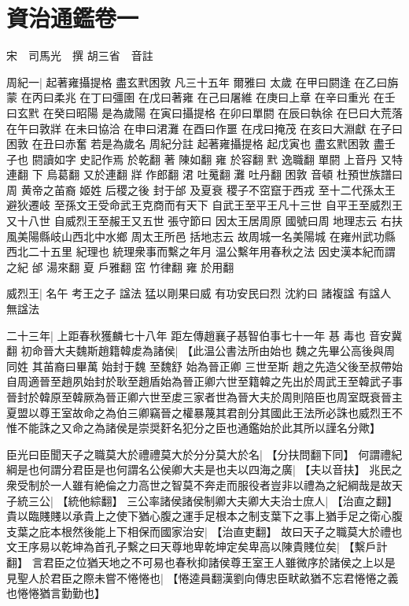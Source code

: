 \section{資治通鑑卷一}


宋　司馬光　撰\newline
胡三省　音註

周紀一|{
	起著雍攝提格 盡玄黓困敦 凡三十五年
	爾雅曰
	太歲
	在甲曰閼逢
	在乙曰旃蒙
	在丙曰柔兆
	在丁曰彊圉
	在戊曰著雍
	在己曰屠維
	在庚曰上章
	在辛曰重光
	在壬曰玄黓
	在癸曰昭陽
	是為歲陽
	在寅曰攝提格
	在卯曰單閼
	在辰曰執徐
	在巳曰大荒落
	在午曰敦牂
	在未曰協洽
	在申曰涒灘
	在酉曰作噩
	在戌曰掩茂
	在亥曰大淵獻
	在子曰困敦
	在丑曰赤奮
	若是為歲名
	周紀分註 起著雍攝提格 起戊寅也
	盡玄黓困敦 盡壬子也
	閼讀如字 史記作焉 於乾翻
	著 陳如翻
	雍 於容翻
	黓 逸職翻
	單閼 上音丹 又特連翻
	下 烏葛翻 又於連翻
	牂 作郎翻
	涒 吐䰟翻
	灘 吐丹翻
	困敦 音頓
	杜預世族譜曰 周 黄帝之苖裔 姬姓
	后稷之後 封于邰 及夏衰 稷子不窋竄于西戎
	至十二代孫太王 避狄遷岐
	至孫文王受命武王克商而有天下
	自武王至平王凡十三世
	自平王至威烈王又十八世
	自威烈王至赧王又五世
	張守節曰 因太王居周原 國號曰周
	地理志云 右扶風美陽縣岐山西北中水鄉 周太王所邑
	括地志云 故周城一名美陽城 在雍州武功縣西北二十五里 紀理也 統理衆事而繫之年月
	温公繫年用春秋之法 因史漢本紀而謂之紀
	邰 湯來翻
	夏 戶雅翻
	窋 竹律翻
	雍 於用翻}
\par
威烈王|{
	名午 考王之子
	諡法 猛以剛果曰威 有功安民曰烈
	沈約曰 諸複諡 有諡人 無諡法}
\par
二十三年|{
	上距春秋獲麟七十八年 距左傳趙襄子惎智伯事七十一年
	惎 毒也 音安冀翻}
初命晉大夫魏斯趙籍韓䖍為諸侯|{
	【此温公書法所由始也
	魏之先畢公高後與周同姓 其苖裔曰畢萬 始封于魏
	至魏舒 始為晉正卿 三世至斯
	趙之先造父後至叔帶始自周適晉至趙夙始封於耿至趙盾始為晉正卿六世至籍韓之先出於周武王至韓武子事晉封於韓原至韓厥為晉正卿六世至䖍三家者世為晉大夫於周則陪臣也周室既衰晉主夏盟以尊王室故命之為伯三卿竊晉之權暴蔑其君剖分其國此王法所必誅也威烈王不惟不能誅之又命之為諸侯是崇奨姧名犯分之臣也通鑑始於此其所以謹名分歟】}
\par
臣光曰臣聞天子之職莫大於禮禮莫大於分分莫大於名|{
	【分扶問翻下同】}
何謂禮紀綱是也何謂分君臣是也何謂名公侯卿大夫是也夫以四海之廣|{
	【夫以音扶】}
兆民之衆受制於一人雖有絶倫之力高世之智莫不奔走而服役者豈非以禮為之紀綱哉是故天子統三公|{
	【統他綜翻】}
三公率諸侯諸侯制卿大夫卿大夫治士庶人|{
	【治直之翻】}
貴以臨賤賤以承貴上之使下猶心腹之運手足根本之制支葉下之事上猶手足之衛心腹支葉之庇本根然後能上下相保而國家治安|{
	【治直吏翻】}
故曰天子之職莫大於禮也文王序易以乾坤為首孔子繫之曰天尊地卑乾坤定矣卑高以陳貴賤位矣|{
	【繫戶計翻】}
言君臣之位猶天地之不可易也春秋抑諸侯尊王室王人雖微序於諸侯之上以是見聖人於君臣之際未嘗不惓惓也|{
	【惓逵員翻漢劉向傳忠臣畎畝猶不忘君惓惓之義也惓惓猶言勤勤也】}
